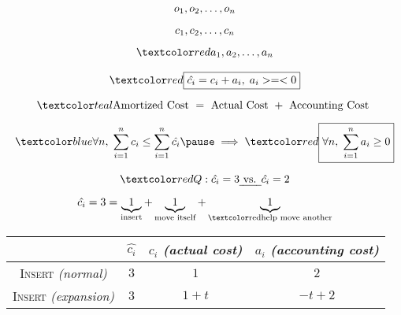 \begin{frame}{}
  \begin{gather*}
    o_1, o_2, \ldots, o_n \\[5pt]
    c_1, c_2, \ldots, c_n \\[5pt]
    \red{a_1, a_2, \ldots, a_n}
  \end{gather*}

  \pause
  \vspace{-0.30cm}
  \[
    \red{\boxed{\hat{c_i} = c_i + a_i, \; a_i >=< 0}}
  \]

  \[
    \teal{\text{Amortized Cost } = \text{ Actual Cost } + \text{ Accounting Cost }}
  \]

  \pause
  \[
	\blue{\forall n,\; \sum_{i=1}^{n} c_i \le \sum_{i=1}^{n} \hat{c_i}} \pause \implies \red{\boxed{\forall n,\; \sum_{i=1}^{n} a_i \geq 0}}
  \]

  \pause
  \begin{center}
    {\large {}}
  \end{center}
\end{frame}

\begin{frame}{}
  \centerline{}

  \[
    \red{Q:}\; \hat{c_i} = 3 \text{\emph{ vs. }} \hat{c_i} = 2
  \]

  \pause
  \[
    \hat{c_i} = 3 = \underbrace{1}_{\textrm{insert}} +
    \underbrace{1}_{\textrm{move itself}} + \underbrace{1}_{\textrm{\red{help move another}}}
  \]

  \pause
  \vspace{0.30cm}
  \begin{table}
    \begin{tabular}{c|ccc}
      & $\hat{c_i}$ & $c_i$ {\it (actual cost)} & $a_i$ {\it (accounting cost)}
      \\ \hline
      \textsc{Insert} {\it (normal)} & $3$ & $1$ & $2$\\
      \textsc{Insert} {\it (expansion)} & $3$ & $1 + t$ & $-t + 2$
    \end{tabular}
  \end{table}
\end{frame}

